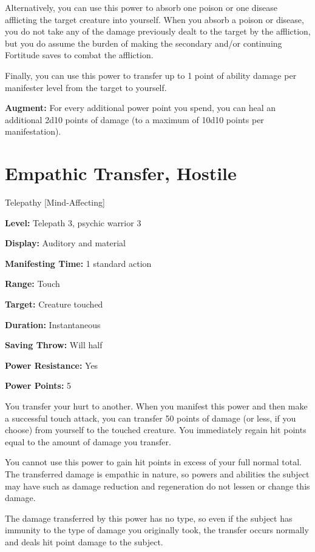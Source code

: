 \documentclass{article}
\begin{document}
Alternatively, you can use this power to absorb one poison or one disease afflicting 
the target creature into yourself. When you absorb a poison or disease, you do 
not take any of the damage previously dealt to the target by the affliction, but 
you do assume the burden of making the secondary and/or continuing Fortitude saves 
to combat the affliction.

Finally, you can use this power to transfer up to 1 point of ability damage per 
manifester level from the target to yourself.

\textbf{Augment:} For every additional power point you spend, you can heal an additional 
2d10 points of damage (to a maximum of 10d10 points per manifestation).

\vspace{12pt}
\section*{Empathic Transfer, Hostile}

Telepathy [Mind-Affecting]

\textbf{Level:} Telepath 3, psychic warrior 3

\textbf{Display:} Auditory and material

\textbf{Manifesting Time:} 1 standard action

\textbf{Range:} Touch

\textbf{Target:} Creature touched

\textbf{Duration:} Instantaneous

\textbf{Saving Throw:} Will half

\textbf{Power Resistance:} Yes

\textbf{Power Points:} 5

You transfer your hurt to another. When you manifest this power and then make a 
successful touch attack, you can transfer 50 points of damage (or less, if you 
choose) from yourself to the touched creature. You immediately regain hit points 
equal to the amount of damage you transfer.

You cannot use this power to gain hit points in excess of your full normal total. 
The transferred damage is empathic in nature, so powers and abilities the subject 
may have such as damage reduction and regeneration do not lessen or change this 
damage.

The damage transferred by this power has no type, so even if the subject has immunity 
to the type of damage you originally took, the transfer occurs normally and deals 
hit point damage to the subject.
\end{document}
